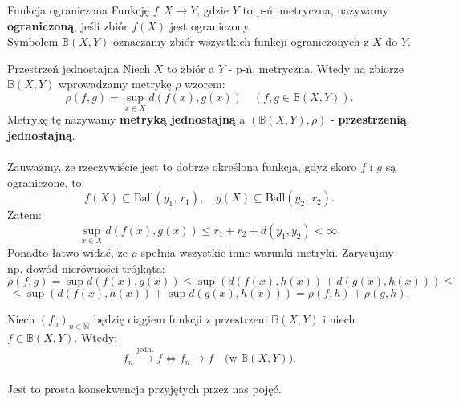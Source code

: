\documentclass{article}
\numberwithin{defi}{section}
\numberwithin{defi}{section}
\newcommand{\N}{\mathbb{N}}
\newcommand{\B}{\mathbb{B}}
\newcommand{\oo}{\infty}
\newcommand{\se}{\subseteq}
\renewcommand{\leq}{\leqslant}
\newcommand{\tb}[1]{\textbf{#1}}
\newcommand{\ciag}[1]{(#1_{n})_{n \in \N}}
\newcommand{\ball}[2]{\text{Ball}(#1, \, #2)}
\newcommand{\tojedn}{\xrightarrow{\text{jedn.}}}
\begin{document}
\begin{defr}{Funkcja ograniczona}
    Funkcję $f: X \to Y$, gdzie $Y$ to p-ń. metryczna, nazywamy \tb{ograniczoną}, jeśli zbiór $f(X)$ jest ograniczony. \\
    Symbolem $\B(X, Y)$ oznaczamy zbiór wszystkich funkcji ograniczonych z $X$ do $Y$.
\end{defr}

\begin{defr}{Przestrzeń jednostajna}
    Niech $X$ to zbiór a $Y$ - p-ń. metryczna. Wtedy na zbiorze $\B(X, Y)$ wprowadzamy metrykę $\rho$ wzorem: \begin{equation*}
        \rho(f, g) = \sup_{x \in X} d(f(x), g(x)) \quad (f, g \in \B(X, Y)).
    \end{equation*} Metrykę tę nazywamy \tb{metryką jednostajną} a $(\B(X, Y), \rho)$ - \tb{przestrzenią jednostajną}.
\end{defr}

\paragraph{} Zauważmy, że rzeczywiście jest to dobrze określona funkcja, gdyż skoro $f$ i $g$ są ograniczone, to: \begin{equation*}
    f(X) \se \ball{y_1}{r_1}, \quad g(X) \se \ball{y_2}{r_2}.
\end{equation*} Zatem: \begin{equation*}
    \sup_{x \in X} d(f(x), g(x)) \leq r_1 + r_2 + d(y_1, y_2) < \oo.
\end{equation*}
Ponadto łatwo widać, że $\rho$ spełnia wszystkie inne warunki metryki. Zarysujmy np. dowód nierówności trójkąta: \begin{equation*}
   \rho(f, g) =  \sup d(f(x), g(x)) \leq \sup(d(f(x), h(x)) + d(g(x), h(x))) \leq
\end{equation*} \begin{equation}
     \leq \sup(d(f(x), h(x)) + \sup d(g(x), h(x))) = \rho(f, h) + \rho(g, h).
\end{equation}

\begin{obs}{}
    Niech $\ciag{f}$ będzię ciągiem funkcji z przestrzeni $\B(X, Y)$ i niech $f \in \B(X, Y)$. Wtedy: \begin{equation}
        f_n \tojedn f \iff f_n \to f \quad \text{(w $\B(X, Y)$).}
    \end{equation}
\end{obs}
\paragraph{} Jest to prosta konsekwencja przyjętych przez nas pojęć.
\end{document}
